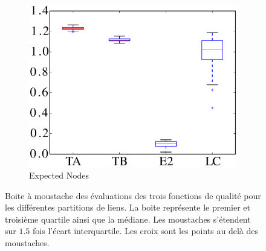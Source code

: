 \begin{figure}
\begin{subfigure}{0.31\textwidth}
		\includegraphics[width=\linewidth]{img/ExpectedNodes/LF/LFR1_ExpectedNodes_ALL.eps}
		\caption{\label{fig:LFMod}Expected Nodes}		
	\end{subfigure}
	\caption{Boite à moustache des évaluations des trois fonctions de qualité pour les différentes partitions de liens. 
	La boite représente le premier et troisième quartile ainsi que la médiane.
	Les moustaches s'étendent sur $1.5$ fois l'écart interquartile. 
	Les croix sont les points au delà des moustaches.
	}
	\label{fig:LF}
\end{figure}



